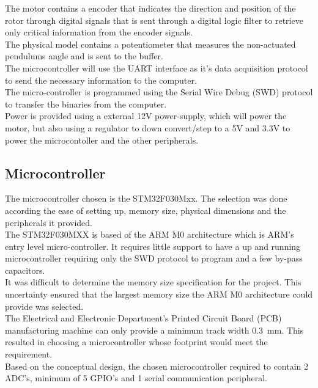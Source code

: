 The motor contains a encoder that indicates the direction and position of the rotor through digital signals that is sent through a digital logic filter to retrieve only critical information from the encoder signals. \\

The physical model contains a potentiometer that measures the non-actuated pendulums angle and is sent to the buffer.\\

The microcontroller will use the UART interface as it's data acquisition protocol to send the necessary information to the computer. \\

The micro-controller is programmed using the Serial Wire Debug (SWD) protocol to transfer the binaries from the computer.\\

Power is provided using a external 12V power-supply, which will power the motor, but also using a regulator to down convert/step to a 5V and 3.3V to power the microcontoller and the other peripherals.


\subsection{Microcontroller}
The microcontroller chosen is the STM32F030Mxx. The selection was done according the ease of setting up, memory size, physical dimensions and the peripherals it provided.\\

The STM32F030MXX is based of the ARM M0 architecture which is ARM's entry level micro-controller. It requires little support to have a up and running microcontroller requiring only the SWD protocol to program and a few by-pass capacitors.\\

It was difficult to determine the memory size specification for the project. This uncertainty ensured that the largest memory size the ARM M0 architecture could provide was selected.\\

The Electrical and Electronic Department's Printed Circuit Board (PCB) manufacturing machine can only provide a  minimum track width \SI{0.3}{mm}. This resulted in choosing a microcontroller whose footprint would meet the requirement.\\

Based on the conceptual design, the chosen microcontroller required to contain 2 ADC's, minimum of 5 GPIO's and 1 serial communication peripheral.


